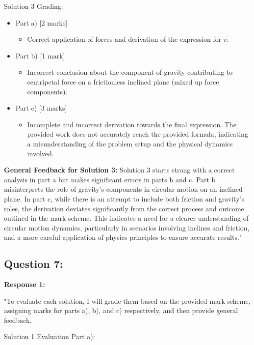\documentclass[a4paper,11pt]{article}
\begin{document}
Solution 3 Grading:

\begin{itemize}
    \item Part a) [2 marks]
    \begin{itemize}
        \item Correct application of forces and derivation of the expression for \(v\).
    \end{itemize}
    \item Part b) [1 mark]
    \begin{itemize}
        \item Incorrect conclusion about the component of gravity contributing to centripetal force on a frictionless inclined plane (mixed up force components).
    \end{itemize}
    \item Part c) [3 marks]
    \begin{itemize}
        \item Incomplete and incorrect derivation towards the final expression. The provided work does not accurately reach the provided formula, indicating a misunderstanding of the problem setup and the physical dynamics involved.
    \end{itemize}
\end{itemize}

\textbf{General Feedback for Solution 3:}
Solution 3 starts strong with a correct analysis in part a but makes significant errors in parts b and c. Part b misinterprets the role of gravity's components in circular motion on an inclined plane. In part c, while there is an attempt to include both friction and gravity's roles, the derivation deviates significantly from the correct process and outcome outlined in the mark scheme. This indicates a need for a clearer understanding of circular motion dynamics, particularly in scenarios involving inclines and friction, and a more careful application of physics principles to ensure accurate results."

\subsection*{Question 7:}

\textbf{Response 1:}

"To evaluate each solution, I will grade them based on the provided mark scheme, assigning marks for parts a), b), and c) respectively, and then provide general feedback.

Solution 1 Evaluation
Part a):
\end{document}
